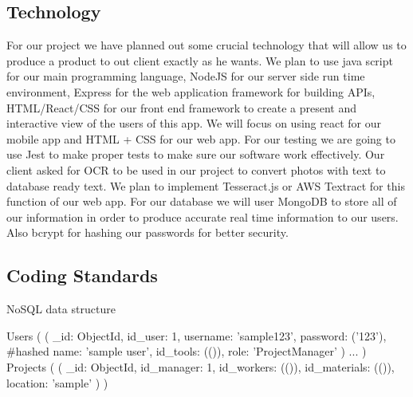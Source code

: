 \documentclass{article}
\begin{document}
\subsection{Technology}

For our project we have planned out some crucial technology that will allow us to produce a product to out client exactly as he wants. We plan to use java script for our main programming language, NodeJS for our server side run time environment, Express for the web application framework for building APIs, HTML/React/CSS for our front end framework to create a present and interactive view of the users of this app. We will focus on using react for our mobile app and HTML + CSS for our web app. For our testing we are going to use Jest to make proper tests to make sure our software work effectively. Our client asked for OCR to be used in our project to convert photos with text to database ready text. We plan to implement Tesseract.js or AWS Textract for this function of our web app. For our database we will user MongoDB to store all of our information in order to produce accurate real time information to our users. Also bcrypt for hashing our passwords for better security. 

\subsection{Coding Standards}

NoSQL data structure

Users
    (
        (
        \_id: ObjectId,
        id\_user: 1,
        username: 'sample123',
        password: ('123'), \#hashed
        name: 'sample user',
        id\_tools: (()),
        role: 'ProjectManager'
        )
        ...
    )
Projects
    (
        (
        \_id: ObjectId,
        id\_manager: 1,
        id\_workers: (()),
        id\_materials: (()),
        location: 'sample'
        )
    )
\end{document}
